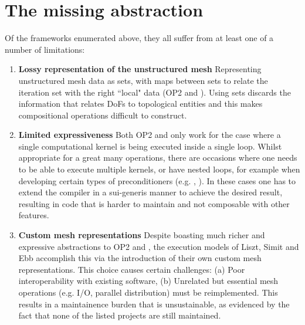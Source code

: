 \documentclass[thesis]{subfiles}
\begin{document}

\section{The missing abstraction}

Of the frameworks enumerated above, they all suffer from at least one of a number of limitations:

\begin{enumerate}
  \item
    \textbf{Lossy representation of the unstructured mesh}
    Representing unstructured mesh data as sets, with maps between sets to relate the iteration set with the right ``local" data (OP2 and ).
    Using sets discards the information that relates DoFs to topological entities and this makes compositional operations difficult to construct.

  \item
    \textbf{Limited expressiveness}
    Both OP2 and  only work for the case where a single computational kernel is being executed inside a single loop.
    Whilst appropriate for a great many operations, there are occasions where one needs to be able to execute multiple kernels, or have nested loops, for example when developing certain types of preconditioners (e.g. \cite{gibsonSlateExtendingFiredrake2020}, \cite{farrellPCPATCHSoftwareTopological2021}).
    In these cases one has to extend the compiler in a sui-generis manner to achieve the desired result, resulting in code that is harder to maintain and not composable with other features.

  \item
    \textbf{Custom mesh representations}
    Despite boasting much richer and expressive abstractions to OP2 and , the execution models of Liszt, Simit and Ebb accomplish this via the introduction of their own custom mesh representations.
    This choice causes certain challenges:
    (a) Poor interoperability with existing software,
    (b) Unrelated but essential mesh operations (e.g. I/O, parallel distribution) must be reimplemented. This results in a maintainence burden that is unsustainable, as evidenced by the fact that none of the listed projects are still maintained.
\end{enumerate}
\end{document}
